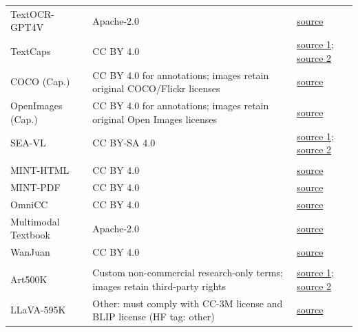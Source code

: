 \begin{longtable}{@{}>{\raggedright\arraybackslash}p{}>{\raggedright\arraybackslash}p{}>{\raggedright\arraybackslash}p{}@{}}
TextOCR-GPT4V & Apache-2.0 & \href{https://huggingface.co/datasets/lmms-lab/LLaVA-OneVision-Data/tree/main/textocr(gpt4v)}{source} \\
TextCaps & CC BY 4.0 & \href{https://dl.fbaipublicfiles.com/textvqa/data/textcaps/TextCaps_0.1_train.json}{source 1}; \href{https://dl.fbaipublicfiles.com/textvqa/images/train_val_images.zip}{source 2} \\
COCO (Cap.) & CC BY 4.0 for annotations; images retain original COCO/Flickr licenses & \href{https://storage.googleapis.com/sfr-vision-language-research/datasets/coco_karpathy_train.json}{source} \\
OpenImages (Cap.) & CC BY 4.0 for annotations; images retain original Open Images licenses & \href{https://storage.googleapis.com/localized-narratives/annotations/open_images_train_v6_localized_narratives-0000*-of-00010.jsonl}{source} \\
SEA-VL & CC BY-SA 4.0 & \href{https://huggingface.co/datasets/SEACrowd/sea-vl_crowdsourced}{source 1}; \href{https://huggingface.co/datasets/SEACrowd/sea-vl_crawling}{source 2} \\
\midrule
\rowcolor{mmdoccolor}\multicolumn{3}{l}{\textit{Multimodal Docs}} \\
MINT-HTML & CC BY 4.0 & \href{https://huggingface.co/datasets/mlfoundations/MINT-1T-HTML}{source} \\
MINT-PDF & CC BY 4.0 & \href{https://huggingface.co/collections/mlfoundations/mint-1t-6690216ca4d0df7e518dde1c}{source} \\
OmniCC & CC BY 4.0 & \href{https://huggingface.co/datasets/OpenGVLab/OmniCorpus-CC}{source} \\
Multimodal Textbook & Apache-2.0 & \href{https://huggingface.co/datasets/DAMO-NLP-SG/multimodal_textbook}{source} \\
WanJuan & CC BY 4.0 & \href{https://opendatalab.org.cn/WanJuan1.0}{source} \\
\midrule
\rowcolor{instructcolor}\multicolumn{3}{l}{\textit{Cap. \& Know.}} \\
Art500K & Custom non-commercial research-only terms; images retain third-party rights & \href{https://drive.google.com/file/d/1sWqPDINj7xSBaYmYxOsaYOLBwJZvg4BB/view}{source 1}; \href{https://drive.google.com/file/d/1HpEiuC7cQRBu0ykpbEH0iKb1Hh5rrvtE/view}{source 2} \\
LLaVA-595K & Other: must comply with CC-3M license and BLIP license (HF tag: other) & \href{https://huggingface.co/datasets/liuhaotian/LLaVA-CC3M-Pretrain-595K}{source} \\

\end{longtable}

